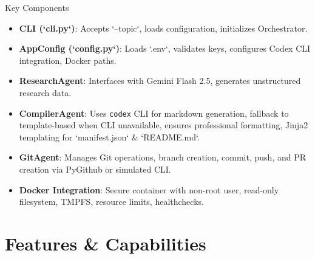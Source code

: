 \documentclass{beamer}
\begin{document}
\begin{frame}{Key Components}
\begin{itemize}
\item \textbf{CLI (`cli.py`)}: Accepts `--topic`, loads configuration, initializes Orchestrator.
\item \textbf{AppConfig (`config.py`)}: Loads `.env`, validates keys, configures Codex CLI integration, Docker paths.
\item \textbf{ResearchAgent}: Interfaces with Gemini Flash 2.5, generates unstructured research data.
\item \textbf{CompilerAgent}: Uses \texttt{codex} CLI for markdown generation, fallback to template-based when CLI unavailable, ensures professional formatting, Jinja2 templating for `manifest.json` & `README.md`.
\item \textbf{GitAgent}: Manages Git operations, branch creation, commit, push, and PR creation via PyGithub or simulated CLI.
\item \textbf{Docker Integration}: Secure container with non-root user, read-only filesystem, TMPFS, resource limits, healthchecks.
\end{itemize}
\end{frame}

\section{Features & Capabilities}
\end{document}
